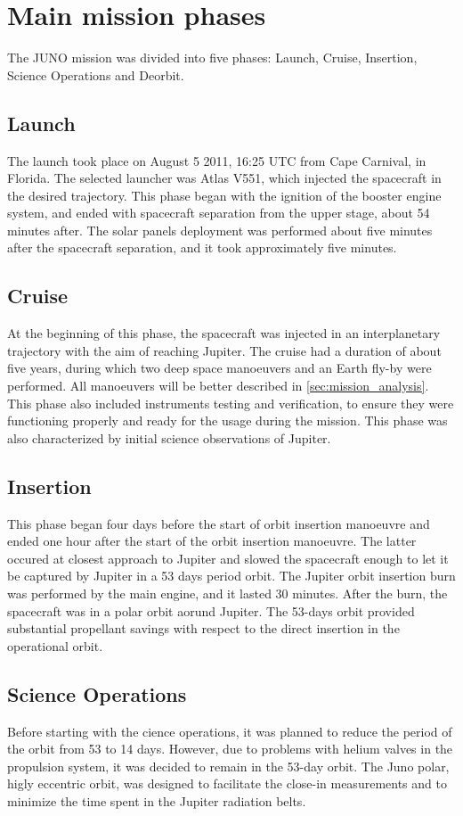 \section{Main mission phases}
\label{sec:phases}
The JUNO mission was divided into five phases: Launch, Cruise, Insertion, Science Operations and Deorbit.
\subsection{Launch}
The launch took place on August 5 2011, 16:25 UTC from Cape Carnival, in Florida. The selected launcher was Atlas V551, which injected the spacecraft in the 
desired trajectory. This phase began with the ignition of the booster engine system, and ended with spacecraft separation from the upper
 stage,  about 54 minutes after. The solar panels deployment was performed about five minutes after the spacecraft separation, and it took approximately five minutes.
 \subsection{Cruise}
 At the beginning of this phase, the spacecraft was injected in an interplanetary trajectory with the aim of reaching Jupiter. The cruise had a duration of about 
 five years, during which two deep space manoeuvers  and an Earth fly-by were performed. All manoeuvers will be better described in 
 \autoref{sec:mission_analysis}. This phase also included instruments testing and verification, to ensure they were functioning properly and ready for the usage
 during the mission. This phase was also characterized by initial science observations of Jupiter. 
 \subsection{Insertion}
 This phase began four days before the start of orbit insertion manoeuvre and ended one hour after the start of the orbit insertion manoeuvre. The latter
 occured at closest approach to Jupiter and slowed the spacecraft enough to let it be captured by Jupiter in a 53 days period orbit. The Jupiter orbit insertion
 burn was performed by the main engine, and it lasted 30 minutes. After the burn, the spacecraft was in a polar orbit aorund Jupiter. The 53-days orbit
 provided substantial propellant savings with respect to the direct insertion in the operational orbit.
 \subsection{Science Operations}
 Before starting with the cience operations, it was planned to reduce the period of the orbit from 53 to 14 days. However, due to problems 
  with helium valves in the propulsion system, it was decided to remain in the 53-day orbit. The Juno polar, higly eccentric orbit, was designed to facilitate the close-in measurements and
  to minimize the time spent in the Jupiter radiation belts.
